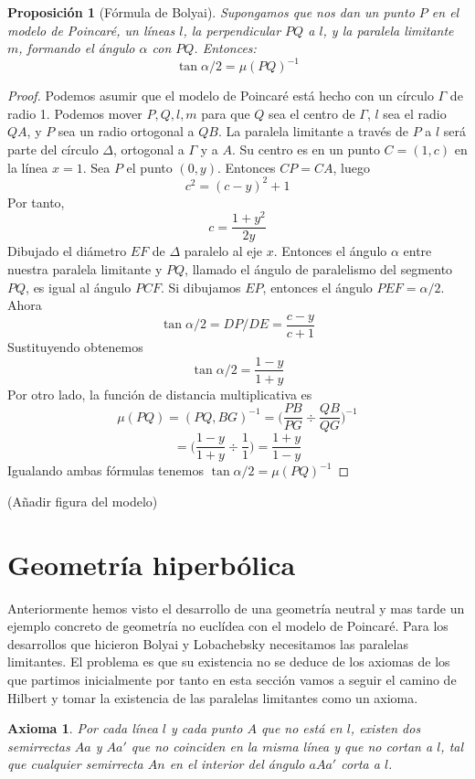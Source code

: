 \documentclass[a4paper]{amsart}
\theoremstyle{plain}
\newtheorem{proposition}{Proposición}
\newtheorem{axiom}{Axioma}
\begin{document}
\begin{proposition}[Fórmula de Bolyai]
Supongamos que nos dan un punto $P$ en el modelo de Poincaré, un líneas $l$, la perpendicular $PQ$ a $l$, y la paralela limitante $m$, formando el ángulo $\alpha$ con $PQ$. Entonces:
\[
\tan\alpha/2=\mu(PQ)^{-1}
\]
\end{proposition}

\begin{proof}
Podemos asumir que el modelo de Poincaré está hecho con un círculo $\Gamma$ de radio 1. Podemos mover $P,Q,l,m$ para que $Q$ sea el centro de $\Gamma$, $l$ sea el radio $QA$, y $P$ sea un radio ortogonal a $QB$. La paralela limitante a través de $P$ a $l$ será parte del círculo $\Delta$, ortogonal a $\Gamma$ y a $A$. Su centro es en un punto $C=(1,c)$ en la línea $x=1$. Sea $P$ el punto $(0,y)$. Entonces $CP=CA$, luego
\[
c^2=(c-y)^2+1
\]
Por tanto,
\[
c=\frac{1+y^2}{2y}
\]
Dibujado el diámetro $EF$ de $\Delta$ paralelo al eje $x$. Entonces el ángulo $\alpha$ entre nuestra paralela limitante y $PQ$, llamado el ángulo de paralelismo del segmento $PQ$, es igual al ángulo $PCF$. Si dibujamos $EP$, entonces el ángulo $PEF=\alpha/2$. Ahora
\[
\tan\alpha/2=DP/DE=\frac{c-y}{c+1}
\]
Sustituyendo obtenemos
\[
\tan\alpha/2=\frac{1-y}{1+y}
\]
Por otro lado, la función de distancia multiplicativa es 
\[
\mu(PQ)=(PQ,BG)^{-1}=\Big(\frac{PB}{PG}\div\frac{QB}{QG}\Big)^{-1}
\]\[
=\Big(\frac{1-y}{1+y}\div\frac{1}{1}\Big)=
\frac{1+y}{1-y}
\]
Igualando ambas fórmulas tenemos $\tan\alpha/2=\mu(PQ)^{-1}$
\end{proof}

(Añadir figura del modelo)

\section{Geometría hiperbólica}

Anteriormente hemos visto el desarrollo de una geometría neutral y mas tarde un ejemplo concreto de geometría no euclídea con el modelo de Poincaré. Para los desarrollos que hicieron Bolyai y Lobachebsky necesitamos las paralelas limitantes. El problema es que su existencia no se deduce de los axiomas de los que partimos inicialmente por tanto en esta sección vamos a seguir el camino de Hilbert y tomar la existencia de las paralelas limitantes como un axioma.

\begin{axiom}\label{Hiperbolico}
Por cada línea $l$ y cada punto $A$ que no está en $l$, existen dos semirrectas $Aa$ y $Aa'$ que no coinciden en la misma línea y que no cortan a $l$, tal que cualquier semirrecta $An$ en el interior del ángulo $aAa'$ corta a $l$.
\end{axiom}
\end{document}
